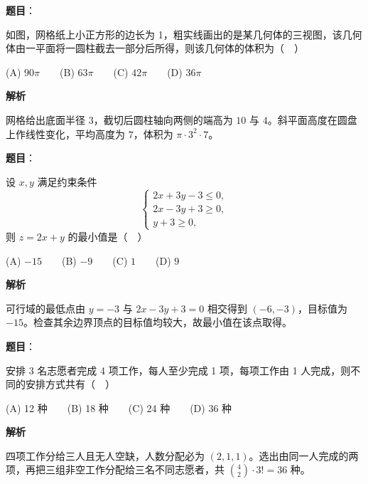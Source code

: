 \begin{answer}

\textbf{题目}：

如图，网格纸上小正方形的边长为 1，粗实线画出的是某几何体的三视图，该几何体由一平面将一圆柱截去一部分后所得，则该几何体的体积为（　）
\nopagebreak[4]
\begin{center}\end{center}
\nopagebreak[4]
   (A) \(90\pi\)　　(B) \(63\pi\)　　(C) \(42\pi\)　　(D) \(36\pi\)

\textbf{解析}

网格给出底面半径 \(3\)，截切后圆柱轴向两侧的端高为 \(10\) 与 \(4\)。斜平面高度在圆盘上作线性变化，平均高度为 \(7\)，体积为 \(\pi\cdot3^2\cdot7\)。


\end{answer}
\begin{answer}

\textbf{题目}：

设 \(x,y\) 满足约束条件
\nopagebreak[4]
\[
   \begin{cases}
   2x+3y-3\leq 0,\\
   2x-3y+3\geq 0,\\
   y+3\geq 0,
   \end{cases}
\]
   则 \(z=2x+y\) 的最小值是（　）

   (A) \(-15\)　　(B) \(-9\)　　(C) \(1\)　　(D) \(9\)

\textbf{解析}

可行域的最低点由 \(y=-3\) 与 \(2x-3y+3=0\) 相交得到 \((-6,-3)\)，目标值为 \(-15\)。检查其余边界顶点的目标值均较大，故最小值在该点取得。


\end{answer}
\begin{answer}

\textbf{题目}：

安排 3 名志愿者完成 4 项工作，每人至少完成 1 项，每项工作由 1 人完成，则不同的安排方式共有（　）

   (A) 12 种　　(B) 18 种　　(C) 24 种　　(D) 36 种

\textbf{解析}

四项工作分给三人且无人空缺，人数分配必为 \((2,1,1)\)。选出由同一人完成的两项，再把三组非空工作分配给三名不同志愿者，共 \(\binom42\cdot3!=36\) 种。


\end{answer}
